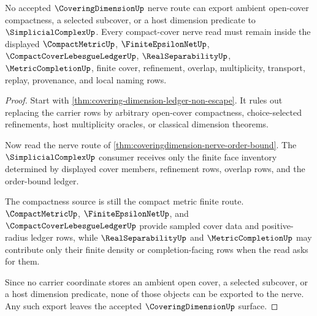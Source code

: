 \begin{theorem}
\label{thm:coveringdimension-compact-cover-nerve-nonescape}
No accepted $\CoveringDimensionUp$ nerve route can export ambient open-cover compactness, a selected subcover, or a host dimension predicate to $\SimplicialComplexUp$. Every compact-cover nerve read must remain inside the displayed $\CompactMetricUp$, $\FiniteEpsilonNetUp$, $\CompactCoverLebesgueLedgerUp$, $\RealSeparabilityUp$, $\MetricCompletionUp$, finite cover, refinement, overlap, multiplicity, transport, replay, provenance, and local naming rows.
\end{theorem}
\begin{proof}
Start with \autoref{thm:covering-dimension-ledger-non-escape}. It rules out replacing the carrier rows by arbitrary open-cover compactness, choice-selected refinements, host multiplicity oracles, or classical dimension theorems.

Now read the nerve route of \autoref{thm:coveringdimension-nerve-order-bound}. The $\SimplicialComplexUp$ consumer receives only the finite face inventory determined by displayed cover members, refinement rows, overlap rows, and the order-bound ledger.

The compactness source is still the compact metric finite route. $\CompactMetricUp$, $\FiniteEpsilonNetUp$, and $\CompactCoverLebesgueLedgerUp$ provide sampled cover data and positive-radius ledger rows, while $\RealSeparabilityUp$ and $\MetricCompletionUp$ may contribute only their finite density or completion-facing rows when the read asks for them.

Since no carrier coordinate stores an ambient open cover, a selected subcover, or a host dimension predicate, none of those objects can be exported to the nerve. Any such export leaves the accepted $\CoveringDimensionUp$ surface.
\end{proof}

